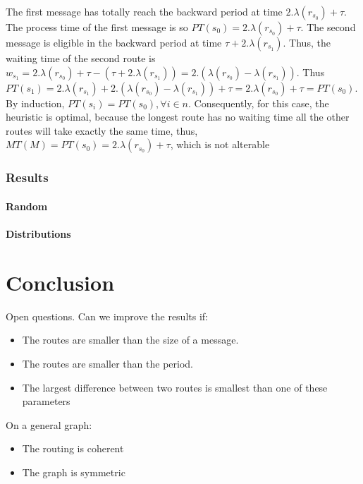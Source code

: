 \documentclass[a4paper,10pt]{article}
\begin{document}
The first message has totally reach the backward period at time $2.\lambda(r_{s_0})+\tau$. The process time of the first message is so $PT(s_0) = 2.\lambda(r_{s_0}) + \tau$.
The second message is eligible in the backward period at time $\tau + 2.\lambda(r_{s_1})$. Thus, the waiting time of the second route is $w_{s_1} = 2.\lambda(r_{s_0})+\tau - (\tau + 2.\lambda(r_{s_1})) = 2.(\lambda(r_{s_0}) - \lambda(r_{s_1}))$. Thus $PT(s_1) = 2.\lambda(r_{s_1}) + 2.(\lambda(r_{s_0}) - \lambda(r_{s_1})) +\tau = 2.\lambda(r_{s_0}) + \tau = PT(s_0)$.
By induction, $PT(s_i) = PT(s_0), \forall i \in n$. 
Consequently, for this case, the heuristic is optimal, because the longest route has no waiting time all the other routes will take exactly the same time, thus, $MT(M) = PT(s_0) = 2.\lambda(r_{s_0}) + \tau$, which is not alterable

     \subsubsection{Results}
	 \paragraph{Random}
	 \paragraph{Distributions}
   
\section{Conclusion}


Open questions. Can we improve the results if:
\begin{itemize}
 \item The routes are smaller than the size of a message. 
\item The routes are smaller than the period.
\item The largest difference between two routes is smallest than one of these parameters
\end{itemize}

 On a general graph:
 
\begin{itemize}
\item The routing is coherent
 \item The graph is symmetric
\end{itemize}




\end{document}
